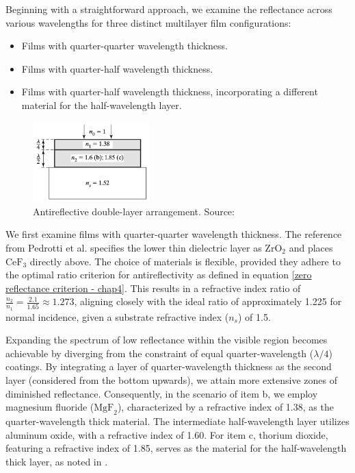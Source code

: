 Beginning with a straightforward approach, we examine the reflectance across various wavelengths for three distinct multilayer film configurations:
\begin{itemize}
    \item Films with quarter-quarter wavelength thickness.
    \item Films with quarter-half wavelength thickness.
    \item Films with quarter-half wavelength thickness, incorporating a different material for the half-wavelength layer.
\end{itemize}

\begin{figure}[ht!]
  \centering
  \includegraphics[width=0.4\textwidth]{Chapters/Figures/Chapter 4 Figures/Antireflecting Double Layer using Quarter and Half-Wavelength Thickness Films Layout.png}
  \caption{Antireflective double-layer arrangement. Source: \cite{pedrotti_introduction_2007}}
  \label{fig:antireflective_double_layer}
\end{figure}

We first examine films with quarter-quarter wavelength thickness. The reference from Pedrotti et al. specifies the lower thin dielectric layer as $\text{ZrO}_2$ and places $\text{CeF}_3$ directly above. The choice of materials is flexible, provided they adhere to the optimal ratio criterion for antireflectivity as defined in equation \ref{zero reflectance criterion - chap4}. This results in a refractive index ratio of $\frac{n_2}{n_1} = \frac{2.1}{1.65} \approx 1.273$, aligning closely with the ideal ratio of approximately 1.225 for normal incidence, given a substrate refractive index ($n_s$) of 1.5.

Expanding the spectrum of low reflectance within the visible region becomes achievable by diverging from the constraint of equal quarter-wavelength ($\lambda/4$) coatings. By integrating a layer of quarter-wavelength thickness as the second layer (considered from the bottom upwards), we attain more extensive zones of diminished reflectance. Consequently, in the scenario of item b, we employ magnesium fluoride ($\text{MgF}_2$), characterized by a refractive index of 1.38, as the quarter-wavelength thick material. The intermediate half-wavelength layer utilizes aluminum oxide, with a refractive index of 1.60. For item c, thorium dioxide, featuring a refractive index of 1.85, serves as the material for the half-wavelength thick layer, as noted in \cite{pedrotti_introduction_2007}.

